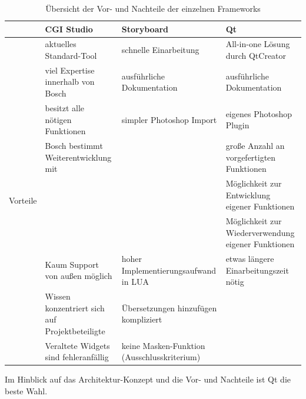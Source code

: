 \begin{table}[h]
	\centering
	\caption[Übersicht der Vor- und Nachteile der einzelnen Frameworks]{Übersicht der Vor- und Nachteile der einzelnen Frameworks}
	\label{tab:tools}
	\begin{tabular}{|p{1.6cm}|p{4.3cm}|p{4.3cm}|p{4.3cm}|}
		\cline{2-4}
		\multicolumn{1}{c|}{}      & CGI Studio                                     & Storyboard                                  & Qt                                                  \\ \hline
		\multirow{15}{*}{Vorteile} & aktuelles Standard-Tool                        & schnelle Einarbeitung                       & All-in-one Lösung durch QtCreator                   \\ \cline{2-4}
		                           & viel Expertise innerhalb von Bosch             & ausführliche Dokumentation                  & ausführliche Dokumentation                          \\ \cline{2-4}
		                           & besitzt alle nötigen Funktionen                & simpler Photoshop Import                    & eigenes Photoshop Plugin                            \\ \cline{2-4}
		                           & Bosch bestimmt Weiterentwicklung mit           &                                             & große Anzahl an vorgefertigten Funktionen           \\ \cline{2-4}
		                           &                                                &                                             & Möglichkeit zur Entwicklung eigener Funktionen      \\ \cline{2-4}
		                           &                                                &                                             & Möglichkeit zur Wiederverwendung eigener Funktionen \\ \hline
		\multirow{9}{*}{Nachteile} & Kaum Support von außen möglich                 & hoher Implementierungsaufwand in LUA        & etwas längere Einarbeitungszeit nötig               \\ \cline{2-4}
		                           & Wissen konzentriert sich auf Projektbeteiligte & Übersetzungen hinzufügen kompliziert        &                                                     \\ \cline{2-4}
		                           & Veraltete Widgets sind fehleranfällig          & keine Masken-Funktion (Ausschlusskriterium) &                                                     \\ \hline
	\end{tabular} 
	
\end{table} 



Im Hinblick auf das Architektur-Konzept und die Vor- und Nachteile ist Qt die beste Wahl.\\


